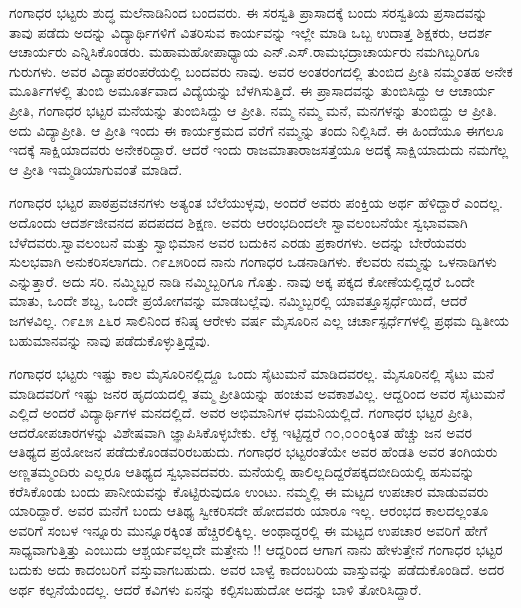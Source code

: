 {ಗಂಗಾಧರ ಭಟ್ಟರು ಶುದ್ಧ ಮಲೆನಾಡಿನಿಂದ ಬಂದವರು. ಈ ಸರಸ್ವತಿ ಪ್ರಾಸಾದಕ್ಕೆ ಬಂದು ಸರಸ್ವತಿಯ ಪ್ರಸಾದವನ್ನು ತಾವು ಪಡೆದು ಅದನ್ನು ವಿದ್ಯಾರ್ಥಿಗಳಿಗೆ ವಿತರಿಸುವ ಕಾರ್ಯವನ್ನು ಇಲ್ಲೇ ಮಾಡಿ ಒಬ್ಬ ಉದಾತ್ತ ಶಿಕ್ಷಕರು, ಆದರ್ಶ ಆಚಾರ್ಯರು ಎನ್ನಿಸಿಕೊಂಡರು. ಮಹಾಮಹೋಪಾಧ್ಯಾಯ ಎನ್.ಎಸ್.ರಾಮಭದ್ರಾಚಾರ್ಯರು ನಮಗಿಬ್ಬರಿಗೂ ಗುರುಗಳು. ಅವರ ವಿದ್ಯಾಪರಂಪರೆಯಲ್ಲಿ  ಬಂದವರು ನಾವು. ಅವರ ಅಂತರಂಗದಲ್ಲಿ ತುಂಬಿದ ಪ್ರೀತಿ ನಮ್ಮಂತಹ ಅನೇಕ ಮೂರ್ತಿಗಳಲ್ಲಿ ತುಂಬಿ ಅಮೂರ್ತ\-ವಾದ ವಿದ್ಯೆಯನ್ನು ಬೆಳಗಿಸುತ್ತಿದೆ. ಈ ಪ್ರಾಸಾದವನ್ನು ತುಂಬಿಸಿದ್ದು ಆ ಆಚಾರ್ಯ ಪ್ರೀತಿ,  ಗಂಗಾಧರ ಭಟ್ಟರ ಮನೆಯನ್ನು ತುಂಬಿಸಿದ್ದು ಆ ಪ್ರೀತಿ. ನಮ್ಮ ನಮ್ಮ ಮನೆ, ಮನಗಳನ್ನು ತುಂಬಿದ್ದು ಆ ಪ್ರೀತಿ. ಅದು ವಿದ್ಯಾಪ್ರೀತಿ. ಆ ಪ್ರೀತಿ ಇಂದು ಈ ಕಾರ್ಯಕ್ರಮದ ವರೆಗೆ ನಮ್ಮನ್ನು ತಂದು ನಿಲ್ಲಿಸಿದೆ. ಈ ಹಿಂದೆಯೂ ಈಗಲೂ ಇದಕ್ಕೆ ಸಾಕ್ಷಿಯಾದವರು ಅನೇಕರಿದ್ದಾರೆ. ಆದರೆ ಇಂದು ರಾಜಮಾತಾ\enginline{-}ರಾಜಸತ್ತೆಯೂ ಅದಕ್ಕೆ ಸಾಕ್ಷಿಯಾದುದು ನಮಗೆಲ್ಲ ಆ ಪ್ರೀತಿ ಇಮ್ಮಡಿಯಾಗುವಂತೆ ಮಾಡಿದೆ.

ಗಂಗಾಧರ ಭಟ್ಟರ ಪಾಠಪ್ರವಚನಗಳು ಅತ್ಯಂತ ಬೆಲೆಯುಳ್ಳವು, ಅಂದರೆ ಅವರು ಪಂಕ್ತಿಯ ಅರ್ಥ ಹೆಳಿದ್ದಾರೆ ಎಂದಲ್ಲ.  ಅದೊಂದು ಆದರ್ಶಜೀವನದ ಪದ\enginline{-}ಪದದ ಶಿಕ್ಷಣ. ಅವರು ಆರಂಭದಿಂದಲೇ ಸ್ವಾವಲಂಬನೆಯೇ ಸ್ವಭಾವವಾಗಿ ಬೆಳೆದವರು.\break ಸ್ವಾವಲಂಬನೆ ಮತ್ತು ಸ್ವಾಭಿಮಾನ ಅವರ ಬದುಕಿನ ಎರಡು ಪ್ರಕಾರಗಳು. ಅದನ್ನು ಬೇರೆಯವರು ಸುಲಭವಾಗಿ ಅನುಕರಿಸಲಾಗದು. ೧೯೭೫ರಿಂದ ನಾನು ಗಂಗಾಧರ ಒಡನಾಡಿಗಳು. ಕೆಲವರು ನಮ್ಮನ್ನು ಒಳನಾಡಿಗಳು ಎನ್ನುತ್ತಾರೆ. ಅದು ಸರಿ. ನಮ್ಮಿಬ್ಬರ ನಾಡಿ ನಮ್ಮಿಬ್ಬರಿಗೂ ಗೊತ್ತು. ನಾವು ಅಕ್ಕ ಪಕ್ಕದ ಕೋಣೆಯಲ್ಲಿದ್ದರೆ ಒಂದೇ ಮಾತು, ಒಂದೇ ಶಬ್ದ, ಒಂದೇ ಪ್ರಯೋಗವನ್ನು ಮಾಡಬಲ್ಲೆವು. ನಮ್ಮಿಬ್ಬರಲ್ಲಿ ಯಾವತ್ತೂ\break ಸ್ಫರ್ಧೆಯಿದೆ, ಆದರೆ ಜಗಳವಿಲ್ಲ. ೧೯೭೫ \enginline{-}೭೬ರ ಸಾಲಿನಿಂದ ಕನಿಷ್ಠ ಆರೇಳು ವರ್ಷ ಮೈಸೂರಿನ ಎಲ್ಲ ಚರ್ಚಾಸ್ಪರ್ಧೆಗಳಲ್ಲಿ ಪ್ರಥಮ ದ್ವಿತೀಯ ಬಹುಮಾನವನ್ನು ನಾವು ಪಡೆದು\-ಕೊಳ್ಳುತ್ತಿದ್ದೆವು.

ಗಂಗಾಧರ ಭಟ್ಟರು ಇಷ್ಟು ಕಾಲ ಮೈಸೂರಿನಲ್ಲಿದ್ದೂ ಒಂದು ಸೈಟು\enginline{-}ಮನೆ ಮಾಡಿದವರಲ್ಲ. ಮೈಸೂರಿನಲ್ಲಿ ಸೈಟು ಮನೆ ಮಾಡಿದವರಿಗೆ ಇಷ್ಟು ಜನರ ಹೃದಯದಲ್ಲಿ ತಮ್ಮ ಪ್ರೀತಿಯನ್ನು ಹಂಚುವ ಅವಕಾಶವಿಲ್ಲ. ಆದ್ದರಿಂದ ಅವರ ಸೈಟು\enginline{-}ಮನೆ ಎಲ್ಲಿದೆ ಅಂದರೆ ವಿದ್ಯಾರ್ಥಿಗಳ ಮನದಲ್ಲಿದೆ. ಅವರ ಅಭಿಮಾನಿಗಳ ಧಮನಿಯಲ್ಲಿದೆ. ಗಂಗಾಧರ ಭಟ್ಟರ ಪ್ರೀತಿ, ಆದರೋಪಚಾರಗಳನ್ನು ವಿಶೇಷವಾಗಿ ಜ್ಞಾಪಿಸಿಕೊಳ್ಳಬೇಕು. ಲೆಕ್ಖ ಇಟ್ಟಿದ್ದರೆ ೧೦,೦೦೦ಕ್ಕಿಂತ ಹೆಚ್ಚು ಜನ ಅವರ ಆತಿಥ್ಯದ ಪ್ರಯೋಜನ ಪಡೆದುಕೊಂಡವರಿರಬಹುದು. ಗಂಗಾಧರ ಭಟ್ಟರಂತೆಯೇ ಅವರ ಹೆಂಡತಿ ಅವರ ತಂಗಿಯರು ಅಣ್ಣ\enginline{-}ತಮ್ಮಂದಿರು ಎಲ್ಲರೂ ಆತಿಥ್ಯದ ಸ್ವಭಾವದವರು. ಮನೆಯಲ್ಲಿ ಹಾಲಿಲ್ಲದಿದ್ದರೆ\break ಪಕ್ಕದಬೀದಿಯಲ್ಲಿ ಹಸುವನ್ನು ಕರೆಸಿಕೊಂಡು ಬಂದು ಪಾನೀಯವನ್ನು ಕೊಟ್ಟಿರು\-ವುದೂ ಉಂಟು. ನಮ್ಮಲ್ಲಿ ಈ ಮಟ್ಟದ ಉಪಚಾರ ಮಾಡುವವರು ಯಾರಿದ್ದಾರೆ. ಅವರ ಮನೆಗೆ ಬಂದು ಆತಿಥ್ಯ ಸ್ವೀಕರಿಸದೇ ಹೋದವರು ಯಾರೂ ಇಲ್ಲ. ಆರಂಭದ ಕಾಲದಲ್ಲಂತೂ ಅವರಿಗೆ ಸಂಬಳ ಇನ್ನೂರು ಮುನ್ನೂರಕ್ಕಿಂತ ಹೆಚ್ಚಿರಲಿಕ್ಕಿಲ್ಲ. ಅಂಥಾದ್ದರಲ್ಲಿ ಈ ಮಟ್ಟದ ಉಪಚಾರ ಅವರಿಗೆ ಹೇಗೆ ಸಾಧ್ಯವಾಗುತ್ತಿತ್ತು ಎಂಬುದು ಆಶ್ಚರ್ಯವಲ್ಲದೇ ಮತ್ತೇನು !! ಆದ್ದರಿಂದ ಆಗಾಗ ನಾನು ಹೇಳುತ್ತೇನೆ ಗಂಗಾಧರ ಭಟ್ಟರ ಬದುಕು ಅದು \hbox{ಕಾದಂಬರಿಗೆ} ವಸ್ತುವಾಗಬಹುದು. ಅವರ ಬಾಳ್ವೆ ಕಾದಂಬರಿಯ ವಾಸ್ತುವನ್ನು ಪಡೆದುಕೊಂಡಿದೆ. ಅದರ ಅರ್ಥ ಕಲ್ಪನೆಯೆಂದಲ್ಲ. ಆದರೆ ಕವಿಗಳು ಏನನ್ನು ಕಲ್ಪಿಸಬಹುದೋ ಅದನ್ನು ಬಾಳಿ ತೋರಿಸಿದ್ದಾರೆ.

}
